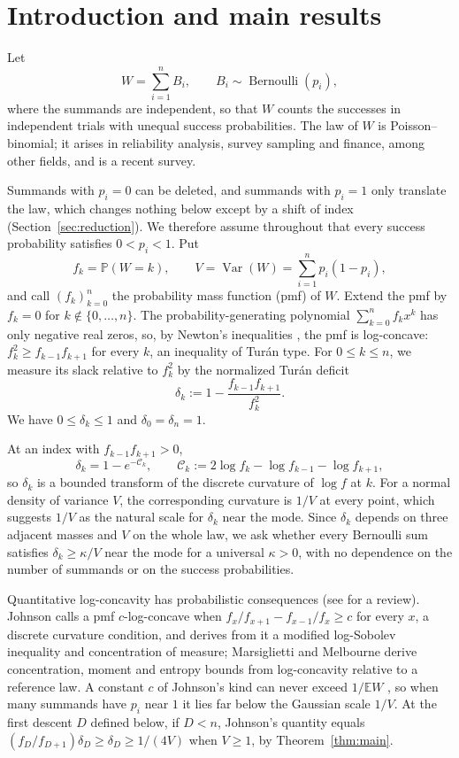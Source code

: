 \documentclass[ECP]{ejpecp}
\newcommand{\Pp}{\mathbb{P}}
\newcommand{\Var}{\operatorname{Var}}
\newcommand{\Ber}{\operatorname{Bernoulli}}
\begin{document}
\section{Introduction and main results}\label{sec:introduction}

Let
\[
  W=\sum_{i=1}^n B_i,
  \qquad B_i\sim\Ber(p_i),
\]
where the summands are independent, so that $W$ counts the successes in
independent trials with unequal success probabilities. The law of $W$ is
Poisson--binomial; it arises in reliability analysis, survey sampling and
finance, among other fields, and \cite{tangtang2023} is a recent survey.

Summands with $p_i=0$ can be deleted, and summands with $p_i=1$ only
translate the law, which changes nothing below except by a shift of index
(Section~\ref{sec:reduction}). We therefore assume throughout that every
success probability satisfies $0<p_i<1$. Put
\[
  f_k=\Pp(W=k),\qquad V=\Var(W)=\sum_{i=1}^n p_i(1-p_i),
\]
and call $(f_k)_{k=0}^n$ the probability mass function (pmf) of $W$. Extend
the pmf by $f_k=0$ for $k\notin\{0,\ldots,n\}$. The probability-generating polynomial
$\sum_{k=0}^n f_kx^k$ has only negative real zeros, so, by Newton's
inequalities \cite[equation~(1)]{pitman1997}, the pmf is log-concave: $f_k^2\geq
f_{k-1}f_{k+1}$ for every $k$, an inequality of Tur\'an type. For
$0\leq k\leq n$, we measure its slack relative to $f_k^2$ by the normalized
Tur\'an deficit
\begin{equation}\label{eq:deficit}
  \delta_k
  :=1-\frac{f_{k-1}f_{k+1}}{f_k^2}.
\end{equation}
We have $0\leq\delta_k\leq1$ and $\delta_0=\delta_n=1$.

At an index with
$f_{k-1}f_{k+1}>0$,
\[
  \delta_k=1-e^{-\mathcal C_k},
  \qquad
  \mathcal C_k:=2\log f_k-\log f_{k-1}-\log f_{k+1},
\]
so $\delta_k$ is a bounded transform of the discrete curvature of $\log f$
at $k$. For a normal density of variance $V$, the corresponding curvature is
$1/V$ at every point, which suggests $1/V$ as the natural scale for
$\delta_k$ near the mode. Since $\delta_k$ depends on three adjacent masses
and $V$ on the whole law, we ask whether every Bernoulli sum satisfies
$\delta_k\geq\kappa/V$ near the mode for a universal $\kappa>0$, with no
dependence on the number of summands or on the success probabilities.

Quantitative log-concavity has probabilistic consequences (see
\cite{saumardwellner2014} for a review). Johnson
\cite{johnson2017discrete} calls a pmf $c$-log-concave when
$f_x/f_{x+1}-f_{x-1}/f_x\geq c$ for every $x$, a discrete curvature condition,
and derives from it a modified log-Sobolev inequality and concentration of
measure; Marsiglietti and Melbourne \cite{marsigliettimelbourne2026} derive
concentration, moment and entropy bounds from log-concavity relative to a
reference law. A constant $c$ of Johnson's kind can never exceed
$1/\mathbb EW$ \cite[Lemma~5.3]{johnson2017discrete}, so when many summands
have $p_i$ near $1$ it lies far below the Gaussian scale $1/V$. At the first
descent $D$ defined below, if $D<n$, Johnson's quantity equals
$(f_D/f_{D+1})\delta_D\geq\delta_D\geq1/(4V)$ when $V\geq1$, by
Theorem~\ref{thm:main}.
\end{document}
